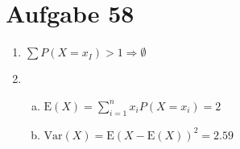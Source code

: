 \section{Aufgabe 58}
\setcounter{section}{58}

\begin{enumerate}
    \item $\sum P(X = x_I) > 1 \Rightarrow \emptyset$

    \item
        \begin{enumerate}[(a)]
            \item $\text{E}(X) = \sum_{i = 1}^n x_iP(X = x_i) = 2$
            \item $\text{Var}(X) = \text{E}(X - \text{E}(X))^2 = 2.59$
        \end{enumerate}
\end{enumerate}
